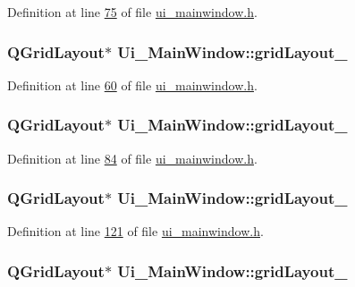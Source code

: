 Definition at line \hyperlink{a00139_source_l00075}{75} of file \hyperlink{a00139_source}{ui\+\_\+mainwindow.\+h}.

\hypertarget{a00080_a8ee86315639f324b17708efc7dbe8b19}{
\subsubsection[{grid\+Layout\+\_\+4}]{\setlength{\rightskip}{0pt plus 5cm}Q\+Grid\+Layout$\ast$ Ui\+\_\+\+Main\+Window\+::grid\+Layout\+\_}}\label{a00080_a8ee86315639f324b17708efc7dbe8b19}


Definition at line \hyperlink{a00139_source_l00060}{60} of file \hyperlink{a00139_source}{ui\+\_\+mainwindow.\+h}.

\hypertarget{a00080_a8731b71c513ff94baf59614807823c5d}{
\subsubsection[{grid\+Layout\+\_\+5}]{\setlength{\rightskip}{0pt plus 5cm}Q\+Grid\+Layout$\ast$ Ui\+\_\+\+Main\+Window\+::grid\+Layout\+\_}}\label{a00080_a8731b71c513ff94baf59614807823c5d}


Definition at line \hyperlink{a00139_source_l00084}{84} of file \hyperlink{a00139_source}{ui\+\_\+mainwindow.\+h}.

\hypertarget{a00080_ad113cf7b76aaf178473555bdf64ff035}{
\subsubsection[{grid\+Layout\+\_\+6}]{\setlength{\rightskip}{0pt plus 5cm}Q\+Grid\+Layout$\ast$ Ui\+\_\+\+Main\+Window\+::grid\+Layout\+\_}}\label{a00080_ad113cf7b76aaf178473555bdf64ff035}


Definition at line \hyperlink{a00139_source_l00121}{121} of file \hyperlink{a00139_source}{ui\+\_\+mainwindow.\+h}.

\hypertarget{a00080_a4c2d544352d423a361b8ab2e1d5636ec}{
\subsubsection[{grid\+Layout\+\_\+7}]{\setlength{\rightskip}{0pt plus 5cm}Q\+Grid\+Layout$\ast$ Ui\+\_\+\+Main\+Window\+::grid\+Layout\+\_}}\label{a00080_a4c2d544352d423a361b8ab2e1d5636ec}


